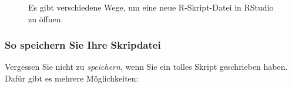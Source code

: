 \documentclass[
  a4paper,
]{scrbook}
\theoremstyle{definition}
\theoremstyle{definition}
\theoremstyle{definition}
\theoremstyle{remark}
\begin{document}
\begin{figure}

\begin{minipage}{0.50\linewidth}



\end{minipage}%
%
\begin{minipage}{0.50\linewidth}



\end{minipage}%

\caption{\label{fig-script-new}Es gibt verschiedene Wege, um eine neue
R-Skript-Datei in RStudio zu öffnen.}

\end{figure}%

\subsubsection{So speichern Sie Ihre
Skripdatei}\label{so-speichern-sie-ihre-skripdatei}

Vergessen Sie nicht zu \emph{speichern}, wenn Sie ein tolles Skript
geschrieben haben. Dafür gibt es mehrere Möglichkeiten:
\end{document}
